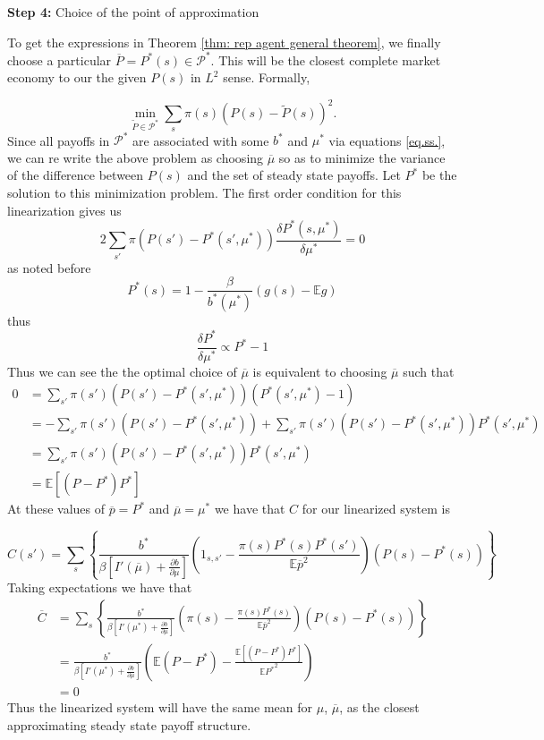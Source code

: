 \documentclass[thmsb,11pt]{article}
\newcommand{\EE}{\mathbb E}
\newcommand{\barC}{{\overline C}}
\newcommand{\pbar}{{\overline p}}
\newcommand{\mubar}{{\overline \mu}}
\begin{document}
\textbf{Step 4:} Choice of the point of approximation

To get the expressions in Theorem \ref{thm: rep agent general theorem}, we finally choose a particular $\overline{P}=P^*(s) \in \mathcal{P}^*$. This will be the closest complete market economy to our the given $P(s)$ in $L^2$ sense. Formally,

\[
\min_{\tilde{P}\in \mathcal{P}^*} \sum_{s}\pi(s)( P(s)-\tilde{P}(s))^2.
\]
Since all payoffs in $\mathcal{P}^*$ are associated with some $b^*$ and $\mu^*$ via equations \eqref{eq.ss.},  we can re write the above problem as choosing $\mubar$ so as to minimize the variance of the difference between $ P(s)$ and the set of steady state payoffs.  Let $P^*$ be the solution to this minimization problem. The first order condition for this linearization gives us
\[
	2\sum_{s'}\pi( P(s')-P^*(s',\mu^*)) \frac{\delta P^*(s,\mu^*)}{\delta \mu^*} = 0
\]as noted before
\[
	P^*(s) =  1 -\frac{\beta}{b^*(\mu^*)}\left(g(s) - \EE g\right)
\]thus
\[
\frac{\delta P^*}{\delta \mu^*}\propto P^*-1
\]Thus we can see the the optimal choice of $\mubar$ is equivalent to choosing $\mubar$ such that
\begin{equation}
	\begin{split}
		0 &= \sum_{s'}\pi(s')( P(s') - P^*(s',\mu^*))(P^*(s',\mu^*)-1)\\
		&= -\sum_{s'}\pi(s')( P(s')-P^*(s',\mu^*)) + \sum_{s'}\pi(s')( P(s')-P^*(s',\mu^*))P^*(s',\mu^*)\\
		&= \sum_{s'}\pi(s')( P(s')-P^*(s',\mu^*))P^*(s',\mu^*)\\
		&=\EE\left[( P-P^*)P^*\right]
	\end{split}
\end{equation}  At these values of $\pbar=P^*$ and $\mubar=\mu^*$ we have that $C$ for our linearized system is

\[
	C(s') = \sum_s\left\{\frac{{b^{*}}}{\beta\left[I'(\mubar)+\frac{\partial b}{\partial\mu}\right]}\left(1_{s,s'}-\frac{\pi(s) P^*(s)P^*(s')}{\EE\pbar^2}\right)(P(s)-P^*(s)) \right\}
\]Taking expectations we have that
\begin{equation}
\begin{split}
	\barC &= \sum_s\left\{\frac{{b^{*}}}{\beta\left[I'(\mu^*)+\frac{\partial b}{\partial\mu}\right]}\left(\pi(s) - \frac{\pi(s)P^*(s)}{\EE\pbar^2}\right)( P(s)-P^*(s))\right\}\\
	&=\frac{{b^{*}}}{\beta\left[I'(\mu^*)+\frac{\partial b}{\partial\mu}\right]}\left(\EE( P-P^*) -\frac{\EE\left[( P-P^*)P^*\right]}{\EE {P^*}^2}\right)\\
	&= 0
\end{split}
\end{equation}  Thus the linearized system will have the same mean for $\mu$, $\mubar$, as the closest approximating steady state payoff structure.
\end{document}
